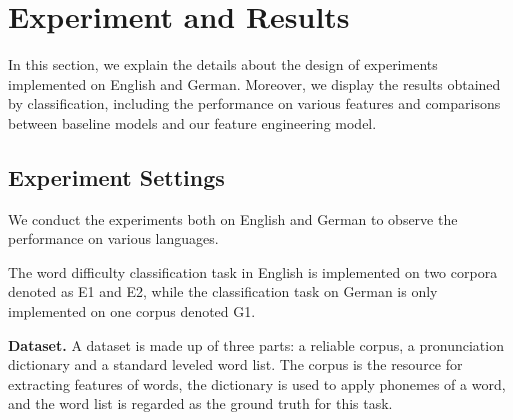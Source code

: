 \section{Experiment and Results}
\label{sec:eval}

In this section, we explain the details about the design of experiments implemented on English and German.
Moreover, we display the results obtained by classification, including the performance on various features and comparisons between baseline models and our feature engineering model.

\subsection{Experiment Settings}
\label{sec:exper}
We conduct the experiments both on English and German to observe the performance on various languages. 

The word difficulty classification task in English is implemented on 
two corpora denoted as E1 and E2,
while the classification task on German is only implemented on 
one corpus denoted G1.

\textbf{Dataset.} 
A dataset is made up of three parts: a reliable corpus, a pronunciation dictionary and a standard leveled word list. The corpus is the resource for extracting 
features of words, the dictionary is used to apply phonemes of a word, and the word list is regarded as the ground truth for this task.

